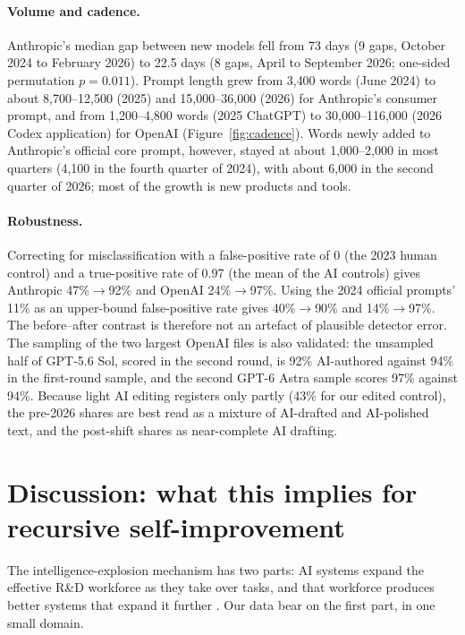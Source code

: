 \documentclass[11pt]{article}
\begin{document}
\paragraph{Volume and cadence.} Anthropic's median gap between new models fell from 73 days (9 gaps, October 2024 to February 2026) to 22.5 days (8 gaps, April to September 2026; one-sided permutation $p=0.011$). Prompt length grew from 3{,}400 words (June 2024) to about 8{,}700--12{,}500 (2025) and 15{,}000--36{,}000 (2026) for Anthropic's consumer prompt, and from 1{,}200--4{,}800 words (2025 ChatGPT) to 30{,}000--116{,}000 (2026 Codex application) for OpenAI (Figure~\ref{fig:cadence}). Words newly added to Anthropic's official core prompt, however, stayed at about 1{,}000--2{,}000 in most quarters (4{,}100 in the fourth quarter of 2024), with about 6{,}000 in the second quarter of 2026; most of the growth is new products and tools.

\paragraph{Robustness.} Correcting for misclassification with a false-positive rate of 0 (the 2023 human control) and a true-positive rate of 0.97 (the mean of the AI controls) gives Anthropic 47\%$\rightarrow$92\% and OpenAI 24\%$\rightarrow$97\%. Using the 2024 official prompts' 11\% as an upper-bound false-positive rate gives 40\%$\rightarrow$90\% and 14\%$\rightarrow$97\%. The before--after contrast is therefore not an artefact of plausible detector error. The sampling of the two largest OpenAI files is also validated: the unsampled half of GPT-5.6 Sol, scored in the second round, is 92\% AI-authored against 94\% in the first-round sample, and the second GPT-6 Astra sample scores 97\% against 94\%. Because light AI editing registers only partly (43\% for our edited control), the pre-2026 shares are best read as a mixture of AI-drafted and AI-polished text, and the post-shift shares as near-complete AI drafting.

\section{Discussion: what this implies for recursive self-improvement}
\label{sec:discussion}

The intelligence-explosion mechanism has two parts: AI systems expand the effective R\&D workforce as they take over tasks, and that workforce produces better systems that expand it further \citep{chan2026explosion}. Our data bear on the first part, in one small domain.
\end{document}
